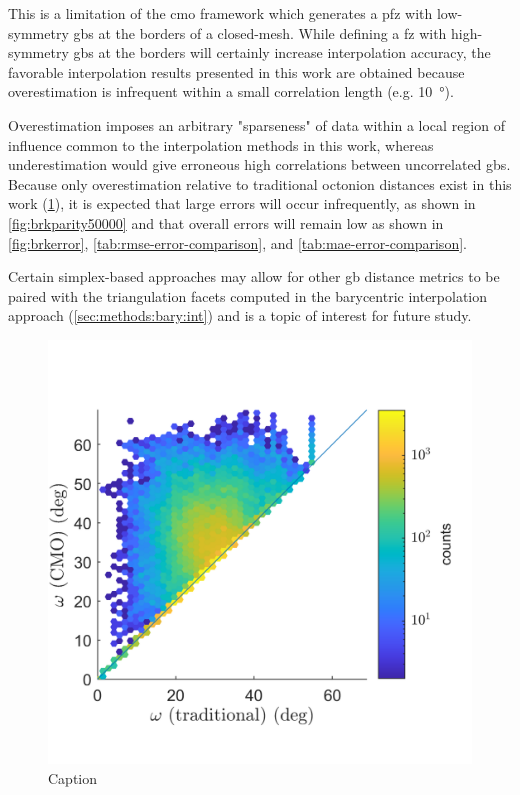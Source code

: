 \documentclass[preprint,12pt]{elsarticle}
\begin{document}
This is a limitation of the \gls{cmo} framework which generates a \gls{pfz} with low-symmetry \glspl{gb} at the borders of a closed-mesh. While defining a \gls{fz} with high-symmetry \glspl{gb} at the borders will certainly increase interpolation accuracy, the favorable interpolation results presented in this work are obtained because overestimation is infrequent within a small correlation length (e.g. \SI{10}{\degree}).

Overestimation imposes an arbitrary "sparseness" of data within a local region of influence common to the interpolation methods in this work, whereas underestimation would give erroneous high correlations between uncorrelated \glspl{gb}. Because only overestimation relative to traditional octonion distances exist in this work (\cref{fig:dist-ensemble-k1}), it is expected that large errors will occur infrequently, as shown in \cref{fig:brkparity50000} and that overall errors will remain low as shown in \cref{fig:brkerror}, \cref{tab:rmse-error-comparison}, and \cref{tab:mae-error-comparison}.

Certain simplex-based approaches \cite{connorHighdimensionalSimplexesSupermetric2017,boissonnatOnlyDistancesAre2017} may allow for other \gls{gb} distance metrics \cite{morawiecDistancesGrainInterfaces2019} to be paired with the triangulation facets computed in the barycentric interpolation approach (\cref{sec:methods:bary:int}) and is a topic of interest for future study.

\begin{figure}
    \centering
    \includegraphics{dist-ensemble-k1.png}
    \caption{Caption}
    \label{fig:dist-ensemble-k1}
\end{figure}
\end{document}
